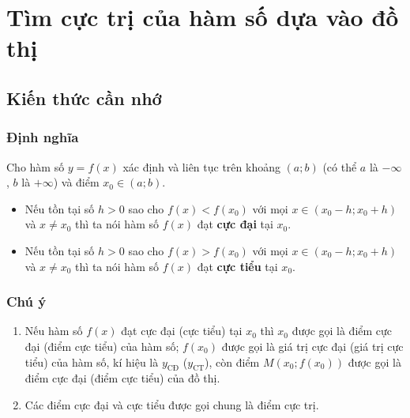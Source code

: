 \setcounter{ex}{0}
\section{Tìm cực trị của hàm số dựa vào đồ thị}
\subsection{Kiến thức cần nhớ}
\begin{khung}
	\subsubsection{Định nghĩa}
Cho hàm số $y=f(x)$ xác định và liên tục trên khoảng $(a;b)$ (có thể $a$ là $-\infty$, $b$ là $+\infty$) và điểm $x_0\in (a;b)$.
\begin{itemize}
\item Nếu tồn tại số $h>0$ sao cho $f(x)<f(x_0)$ với mọi $x\in (x_0-h;x_0+h)$ và $x\neq x_0$ thì ta nói hàm số $f(x)$ đạt {\bf cực đại} tại $x_0$.
\item Nếu tồn tại số $h>0$ sao cho $f(x)>f(x_0)$ với mọi $x\in (x_0-h;x_0+h)$ và $x\neq x_0$ thì ta nói hàm số $f(x)$ đạt {\bf cực tiểu} tại $x_0$.
\end{itemize}
\begin{center}
\end{center}
\subsubsection{Chú ý}
\begin{enumerate}
\item  Nếu hàm số $f(x)$ đạt cực đại (cực tiểu) tại $x_0$ thì $x_0$ được gọi là điểm cực đại (điểm cực tiểu) của hàm số; $f\left(x_0\right)$ được gọi là giá trị cực đại (giá trị cực tiểu) của hàm số, kí hiệu là $y_\text{CĐ}$ ($y_\text{CT}$), còn điểm $M\left(x_0 ; f\left(x_0\right)\right)$ được gọi là điểm cực đại (điểm cực tiểu) của đồ thị.
\item Các điểm cực đại và cực tiểu được gọi chung là điểm cực trị. 
\end{enumerate}
\end{khung}
